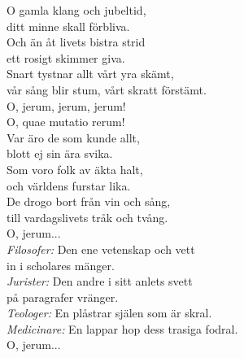 \documentclass[a6paper, 10pt, twoside]{article}
\begin{document}


\noindent
\vspace{20pt} 
\begin{center}
\end{center}
\begin{lyrics}
O gamla klang och jubeltid,\\
ditt minne skall förbliva.\\
Och än åt livets bistra strid\\
ett rosigt skimmer giva.\\
Snart tystnar allt vårt yra skämt,\\
vår sång blir stum, vårt skratt förstämt.\\
O, jerum, jerum, jerum!\\
O, quae mutatio rerum!
\vspace{5pt}\\
Var äro de som kunde allt,\\
blott ej sin ära svika.\\
Som voro folk av äkta halt,\\
och världens furstar lika.\\
De drogo bort från vin och sång,\\
till vardagslivets tråk och tvång.\\
O, jerum...
\vspace{5pt}\\
\textit{Filosofer:} Den ene vetenskap och vett\\
in i scholares mänger.\\
\textit{Jurister:} Den andre i sitt anlets svett\\
på paragrafer vränger.\\
\textit{Teologer:} En plåstrar själen som är skral.\\
\textit{Medicinare:} En lappar hop dess trasiga fodral.\\
O, jerum...


\end{lyrics}
\end{document}
